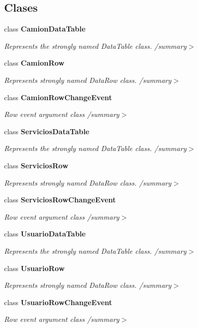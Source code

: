 \subsection*{Clases}
\begin{DoxyCompactItemize}
\item 
class {\bf Camion\-Data\-Table}
\begin{DoxyCompactList}\small\item\em Represents the strongly named Data\-Table class. /summary$>$ \end{DoxyCompactList}\item 
class {\bf Camion\-Row}
\begin{DoxyCompactList}\small\item\em Represents strongly named Data\-Row class. /summary$>$ \end{DoxyCompactList}\item 
class {\bf Camion\-Row\-Change\-Event}
\begin{DoxyCompactList}\small\item\em Row event argument class /summary$>$ \end{DoxyCompactList}\item 
class {\bf Servicios\-Data\-Table}
\begin{DoxyCompactList}\small\item\em Represents the strongly named Data\-Table class. /summary$>$ \end{DoxyCompactList}\item 
class {\bf Servicios\-Row}
\begin{DoxyCompactList}\small\item\em Represents strongly named Data\-Row class. /summary$>$ \end{DoxyCompactList}\item 
class {\bf Servicios\-Row\-Change\-Event}
\begin{DoxyCompactList}\small\item\em Row event argument class /summary$>$ \end{DoxyCompactList}\item 
class {\bf Usuario\-Data\-Table}
\begin{DoxyCompactList}\small\item\em Represents the strongly named Data\-Table class. /summary$>$ \end{DoxyCompactList}\item 
class {\bf Usuario\-Row}
\begin{DoxyCompactList}\small\item\em Represents strongly named Data\-Row class. /summary$>$ \end{DoxyCompactList}\item 
class {\bf Usuario\-Row\-Change\-Event}
\begin{DoxyCompactList}\small\item\em Row event argument class /summary$>$ \end{DoxyCompactList}\end{DoxyCompactItemize}
